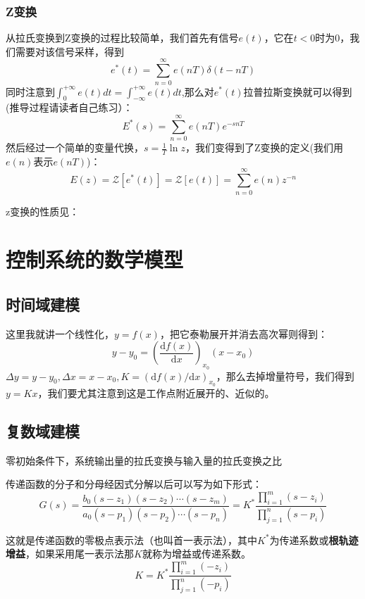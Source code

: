 \documentclass[lang=cn,10pt]{elegantbook}
\begin{document}
\subsection{Z变换}
从拉氏变换到Z变换的过程比较简单，我们首先有信号$e(t)$，它在$t<0$时为0，我们需要对该信号采样，得到
\[e^*(t)=\sum \limits_{n=0}^{\infty}e(nT)\delta(t-nT)\]
同时注意到$\int_{0}^{+\infty} e(t)dt = \int_{-\infty}^{+\infty} e(t)dt$,那么对$e^*(t)$拉普拉斯变换就可以得到(推导过程请读者自己练习）：
\[E^*(s)=\sum \limits_{n=0}^{\infty}e(nT)e^{-snT}\]
然后经过一个简单的变量代换，$s=\frac{1}{T}\ln{z}$，我们变得到了Z变换的定义(我们用$e(n)$表示$e(nT)$)：
\begin{equation}
    E(z)=\mathscr{Z}[e^*(t)]=\mathscr{Z}[e(t)]=\sum \limits_{n=0}^{\infty}e(n)z^{-n}
\end{equation}

z变换的性质见：





\chapter{控制系统的数学模型}

\section{时间域建模}

这里我就讲一个线性化，$y=f(x)$，把它泰勒展开并消去高次幂则得到：
\[y-y_0=\left( \frac{\text{d}f(x)}{\text{d}x}\right)_{x_0} (x-x_0)\]
$\Delta y=y-y_0,\Delta x=x-x_0,K=(\text{d} f(x)/\text{d}x)_{x_0}$，那么去掉增量符号，我们得到$y=Kx$，我们要尤其注意到这是工作点附近展开的、近似的。

\section{复数域建模}

\begin{definition}[传递函数]
    零初始条件下，系统输出量的拉氏变换与输入量的拉氏变换之比
\end{definition}

传递函数的分子和分母经因式分解以后可以写为如下形式：
\[G(s)=\frac{b_0(s-z_1)(s-z_2)\cdots (s-z_m)}{a_0(s-p_1)(s-p_2)\cdots (s-p_n)}=K^*\frac{\prod \limits_{i=1}^m(s-z_i)}{\prod \limits_{j=1}^n(s-p_i)}\]

这就是传递函数的零极点表示法（也叫首一表示法），其中$K^*$为传递系数或\textbf{根轨迹增益}，如果采用尾一表示法那$K$就称为增益或传递系数。
\[K=K^*\frac{\prod \limits_{i=1}^m(-z_i)}{\prod \limits_{j=1}^n(-p_i)} \]
\end{document}
